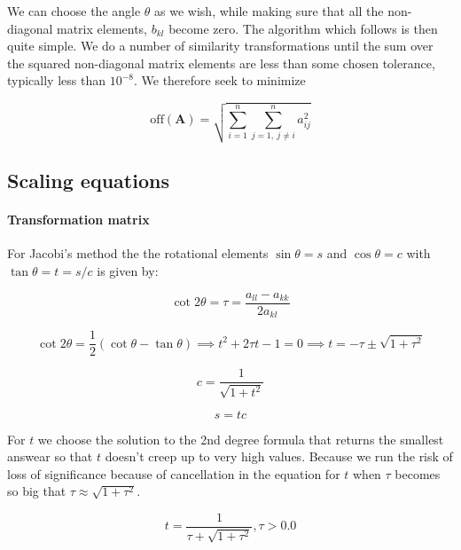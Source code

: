 \documentclass[a4paper, fontsize=11pt]{article}
\begin{document}
We can choose the angle $\theta$ as we wish, while making sure that all the non-diagonal matrix elements, $b_{kl}$ become zero. The algorithm which follows is then quite simple. We do a number of similarity transformations until the sum over the squared non-diagonal matrix elements are less than some chosen tolerance, typically less than $10^{-8}$. We therefore seek to minimize

\begin{equation}
\text{off}(\textbf{A}) = \sqrt{\sum^{n}_{i=1} \sum^{n}_{j=1, \: j \neq i} a_{ij}^{2}}
\end{equation}



\subsection{Scaling equations}
\paragraph{Transformation matrix}

For Jacobi's method the the rotational elements $\sin \theta = s$ and $\cos \theta = c$ with $\tan \theta = t = s / c$ is given by:

\begin{equation}
\cot 2\theta = \tau = \frac{a_{ll} - a_{kk}}{2 a_{kl}}
\end{equation}

\begin{equation}
\cot 2\theta = \frac{1}{2}\left(\cot \theta - \tan \theta \right) \implies t^2 + 2 \tau t - 1 = 0 \implies t = -\tau \pm \sqrt{1 + \tau^2} 
\end{equation}

\begin{equation}
c = \frac{1}{\sqrt{1+ t^2}}
\end{equation}

\begin{equation}
s = tc
\end{equation}

For $t$ we choose the solution to the 2nd degree formula that returns the smallest answear so that $t$ doesn't creep up to very high values. Because we run the risk of loss of significance because of cancellation in the equation for $t$ when $\tau$ becomes so big that $\tau \approx \sqrt{1 + \tau^2}$.

\begin{equation}
t = \frac{1}{\tau + \sqrt{1 + \tau^2}}, \tau > 0.0
\end{equation}
\end{document}
